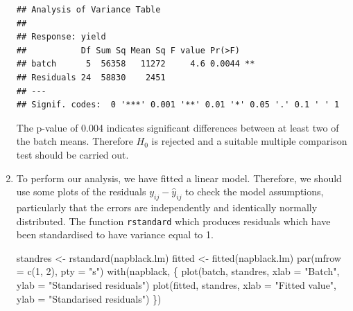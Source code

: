 \documentclass[
]{book}
\newenvironment{Shaded}{\begin{snugshade}}{\end{snugshade}}
\newcommand{\AttributeTok}[1]{\textcolor[rgb]{0.77,0.63,0.00}{#1}}
\newcommand{\DecValTok}[1]{\textcolor[rgb]{0.00,0.00,0.81}{#1}}
\newcommand{\FunctionTok}[1]{\textcolor[rgb]{0.00,0.00,0.00}{#1}}
\newcommand{\NormalTok}[1]{#1}
\newcommand{\OtherTok}[1]{\textcolor[rgb]{0.56,0.35,0.01}{#1}}
\newcommand{\SpecialCharTok}[1]{\textcolor[rgb]{0.00,0.00,0.00}{#1}}
\newcommand{\StringTok}[1]{\textcolor[rgb]{0.31,0.60,0.02}{#1}}
\theoremstyle{definition}
\theoremstyle{definition}
\theoremstyle{definition}
\theoremstyle{definition}
\theoremstyle{remark}
\begin{document}
\begin{enumerate}
\begin{Shaded}
\end{Shaded}

\begin{verbatim}
## Analysis of Variance Table
## 
## Response: yield
##           Df Sum Sq Mean Sq F value Pr(>F)   
## batch      5  56358   11272     4.6 0.0044 **
## Residuals 24  58830    2451                  
## ---
## Signif. codes:  0 '***' 0.001 '**' 0.01 '*' 0.05 '.' 0.1 ' ' 1
\end{verbatim}

  The p-value of 0.004 indicates significant differences between at least two of the batch
  means. Therefore \(H_0\) is rejected and a suitable multiple comparison test should be carried
  out.
\item
  To perform our analysis, we have fitted a linear model. Therefore, we should use some plots of the residuals \(y_{ij} - \hat{y}_{ij}\) to check the model assumptions, particularly that the errors are independently and identically normally distributed. The function \texttt{rstandard} which produces residuals which have been standardised to have variance equal to 1.

\begin{Shaded}
\begin{Highlighting}[]
\NormalTok{standres }\OtherTok{\textless{}{-}} \FunctionTok{rstandard}\NormalTok{(napblack.lm)}
\NormalTok{fitted }\OtherTok{\textless{}{-}} \FunctionTok{fitted}\NormalTok{(napblack.lm)}
\FunctionTok{par}\NormalTok{(}\AttributeTok{mfrow =} \FunctionTok{c}\NormalTok{(}\DecValTok{1}\NormalTok{, }\DecValTok{2}\NormalTok{), }\AttributeTok{pty =} \StringTok{"s"}\NormalTok{)}
\FunctionTok{with}\NormalTok{(napblack, \{}
  \FunctionTok{plot}\NormalTok{(batch, standres, }\AttributeTok{xlab =} \StringTok{"Batch"}\NormalTok{, }\AttributeTok{ylab =} \StringTok{"Standarised residuals"}\NormalTok{)}
  \FunctionTok{plot}\NormalTok{(fitted, standres, }\AttributeTok{xlab =} \StringTok{"Fitted value"}\NormalTok{, }\AttributeTok{ylab =} \StringTok{"Standarised residuals"}\NormalTok{)}
\NormalTok{\})}
\end{Highlighting}
\end{Shaded}


\end{enumerate}
\end{document}
